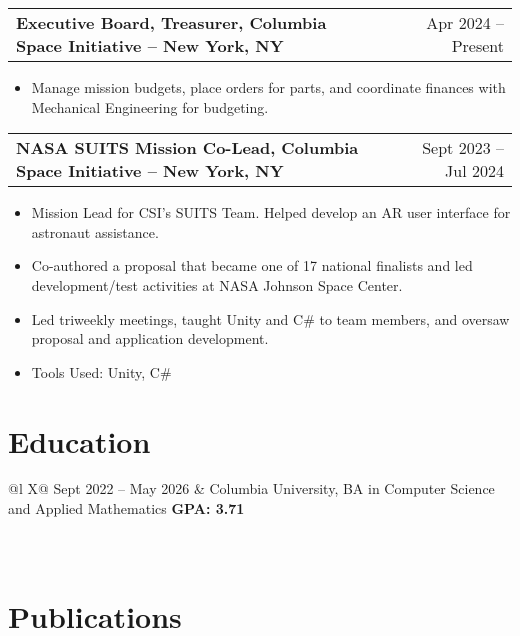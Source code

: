 \documentclass[a4paper,12pt]{article}
\makeatletter
\newenvironment{joblong}[2]
    {
    \begin{tabularx}{\linewidth}{@{}l X r@{}}
    \textbf{#1} & \hfill &  #2 \\[3.75pt]
    \end{tabularx}
    \begin{minipage}[t]{\linewidth}
    \begin{itemize}[nosep,after=\strut, leftmargin=1em, itemsep=3pt,label=--]
    }
    {
    \end{itemize}
    \end{minipage}    
    }
\makeatother
\begin{document}
\begin{joblong}{Executive Board, Treasurer, Columbia Space Initiative -- New York, NY}{Apr 2024 -- Present}
\item Manage mission budgets, place orders for parts, and coordinate finances with Mechanical Engineering for budgeting.
\end{joblong}

\begin{joblong}{NASA SUITS Mission Co-Lead, Columbia Space Initiative -- New York, NY}{Sept 2023 -- Jul 2024}
\item Mission Lead for CSI's SUITS Team. Helped develop an AR user interface for astronaut assistance.
\item Co-authored a proposal that became one of 17 national finalists and led development/test activities at NASA Johnson Space Center.
\item Led triweekly meetings, taught Unity and C\# to team members, and oversaw proposal and application development.
\item Tools Used: Unity, C\#
\end{joblong}

\section{Education}
\begin{tabularx}{\linewidth}{@{}l X@{}}
Sept 2022 -- May 2026 & Columbia University, BA in Computer Science and Applied Mathematics \hfill \textbf{GPA: 3.71} \\
 \\
 \\
\end{tabularx}

\section{Publications}
\begin{refsection}
\nocite{*}
\printbibliography[heading=none]
\end{refsection}
\end{document}
